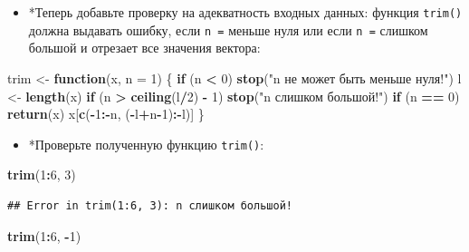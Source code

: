 \documentclass[]{book}
\newenvironment{Shaded}{\begin{snugshade}}{\end{snugshade}}
\newcommand{\KeywordTok}[1]{\textcolor[rgb]{0.13,0.29,0.53}{\textbf{#1}}}
\newcommand{\DataTypeTok}[1]{\textcolor[rgb]{0.13,0.29,0.53}{#1}}
\newcommand{\DecValTok}[1]{\textcolor[rgb]{0.00,0.00,0.81}{#1}}
\newcommand{\StringTok}[1]{\textcolor[rgb]{0.31,0.60,0.02}{#1}}
\newcommand{\ControlFlowTok}[1]{\textcolor[rgb]{0.13,0.29,0.53}{\textbf{#1}}}
\newcommand{\OperatorTok}[1]{\textcolor[rgb]{0.81,0.36,0.00}{\textbf{#1}}}
\newcommand{\NormalTok}[1]{#1}
\providecommand{\tightlist}{%
  \setlength{\itemsep}{0pt}\setlength{\parskip}{0pt}}
\begin{document}
\begin{itemize}
\tightlist
\item
  *Теперь добавьте проверку на адекватность входных данных: функция
  \texttt{trim()} должна выдавать ошибку, если \texttt{n\ =} меньше нуля
  или если \texttt{n\ =} слишком большой и отрезает все значения
  вектора:
\end{itemize}

\begin{Shaded}
\begin{Highlighting}[]
\NormalTok{trim <-}\StringTok{ }\ControlFlowTok{function}\NormalTok{(x, }\DataTypeTok{n =} \DecValTok{1}\NormalTok{) \{}
  \ControlFlowTok{if}\NormalTok{ (n }\OperatorTok{<}\StringTok{ }\DecValTok{0}\NormalTok{) }\KeywordTok{stop}\NormalTok{(}\StringTok{"n не может быть меньше нуля!"}\NormalTok{)}
\NormalTok{  l <-}\StringTok{ }\KeywordTok{length}\NormalTok{(x)}
  \ControlFlowTok{if}\NormalTok{ (n }\OperatorTok{>}\StringTok{ }\KeywordTok{ceiling}\NormalTok{(l}\OperatorTok{/}\DecValTok{2}\NormalTok{) }\OperatorTok{-}\StringTok{ }\DecValTok{1}\NormalTok{) }\KeywordTok{stop}\NormalTok{(}\StringTok{"n слишком большой!"}\NormalTok{)}
  \ControlFlowTok{if}\NormalTok{ (n }\OperatorTok{==}\StringTok{ }\DecValTok{0}\NormalTok{) }\KeywordTok{return}\NormalTok{(x)}
\NormalTok{  x[}\KeywordTok{c}\NormalTok{(}\OperatorTok{-}\DecValTok{1}\OperatorTok{:-}\NormalTok{n, (}\OperatorTok{-}\NormalTok{l}\OperatorTok{+}\NormalTok{n}\OperatorTok{-}\DecValTok{1}\NormalTok{)}\OperatorTok{:-}\NormalTok{l)]}
\NormalTok{\}}
\end{Highlighting}
\end{Shaded}

\begin{itemize}
\tightlist
\item
  *Проверьте полученную функцию \texttt{trim()}:
\end{itemize}

\begin{Shaded}
\begin{Highlighting}[]
\KeywordTok{trim}\NormalTok{(}\DecValTok{1}\OperatorTok{:}\DecValTok{6}\NormalTok{, }\DecValTok{3}\NormalTok{)}
\end{Highlighting}
\end{Shaded}

\begin{verbatim}
## Error in trim(1:6, 3): n слишком большой!
\end{verbatim}

\begin{Shaded}
\begin{Highlighting}[]
\KeywordTok{trim}\NormalTok{(}\DecValTok{1}\OperatorTok{:}\DecValTok{6}\NormalTok{, }\OperatorTok{-}\DecValTok{1}\NormalTok{)}
\end{Highlighting}
\end{Shaded}
\end{document}
